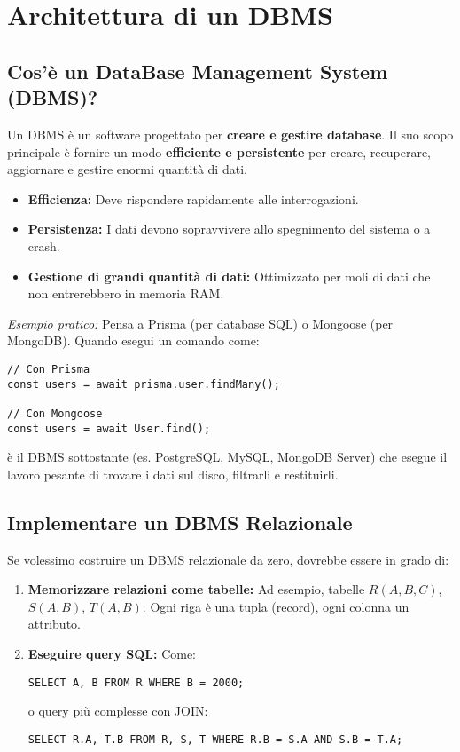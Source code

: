 \section{Architettura di un DBMS}

\subsection{Cos'è un DataBase Management System (DBMS)?}
Un DBMS è un software progettato per \textbf{creare e gestire database}. Il suo scopo principale è fornire un modo \textbf{efficiente e persistente} per creare, recuperare, aggiornare e gestire enormi quantità di dati.
\begin{itemize}
    \item \textbf{Efficienza:} Deve rispondere rapidamente alle interrogazioni.
    \item \textbf{Persistenza:} I dati devono sopravvivere allo spegnimento del sistema o a crash.
    \item \textbf{Gestione di grandi quantità di dati:} Ottimizzato per moli di dati che non entrerebbero in memoria RAM.
\end{itemize}

\textit{Esempio pratico:} Pensa a Prisma (per database SQL) o Mongoose (per MongoDB). Quando esegui un comando come:
\begin{verbatim}
// Con Prisma
const users = await prisma.user.findMany();

// Con Mongoose
const users = await User.find();
\end{verbatim}
è il DBMS sottostante (es. PostgreSQL, MySQL, MongoDB Server) che esegue il lavoro pesante di trovare i dati sul disco, filtrarli e restituirli.

\subsection{Implementare un DBMS Relazionale}
Se volessimo costruire un DBMS relazionale da zero, dovrebbe essere in grado di:
\begin{enumerate}
    \item \textbf{Memorizzare relazioni come tabelle:} Ad esempio, tabelle $R(A,B,C)$, $S(A,B)$, $T(A,B)$. Ogni riga è una tupla (record), ogni colonna un attributo.
    \item \textbf{Eseguire query SQL:} Come:
    \begin{verbatim}
SELECT A, B FROM R WHERE B = 2000;
    \end{verbatim}
    o query più complesse con JOIN:
    \begin{verbatim}
SELECT R.A, T.B FROM R, S, T WHERE R.B = S.A AND S.B = T.A;
    \end{verbatim}
\end{enumerate}

